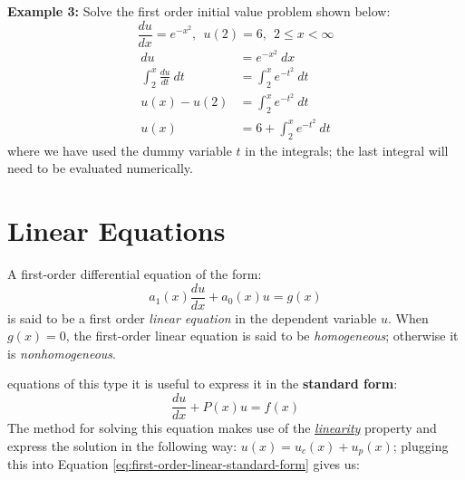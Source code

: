 \begin{example}[h!]
\textbf{Example 3:}
Solve the first order initial value problem shown below:
\begin{equation}
\frac{du}{dx} = e^{-x^2}, \ \ u(2) = 6, \ \ 2 \le x < \infty
\end{equation}
\begin{align*}
du &= e^{-x^2}\ dx \\
\int_2^{x} \frac{du}{dt} \ dt &= \int_{2}^{x} e^{-t^2} \ dt \\
u(x) - u(2) &= \int_{2}^{x} e^{-t^2} \ dt \\
u(x) &= 6 + \int_{2}^{x} e^{-t^2} \ dt
\end{align*}
where we have used the dummy variable $t$ in the integrals; the last integral will need to be evaluated numerically.

\end{example}

\section{Linear Equations}
A first-order differential equation of the form:
\begin{equation}
a_1(x)\frac{du}{dx} + a_0(x)u = g(x)
\label{eq:lin_first_order}
\end{equation}
is said to be a first order \emph{linear equation} in the dependent variable $u$.
When $g(x) = 0$, the first-order linear equation is said to be \emph{homogeneous}; otherwise it is \emph{nonhomogeneous}.

 equations of this type it is useful to express it in the \textbf{standard form}:
\begin{equation}
\frac{du}{dx}+P(x)u = f(x)
\label{eq:first-order-linear-standard-form}
\end{equation}  
The method for solving this equation makes use of the \underline{\emph{linearity}} property and express the solution in the following way: $u(x) = u_c(x) + u_p(x)$; plugging this into Equation \ref{eq:first-order-linear-standard-form} gives us:


